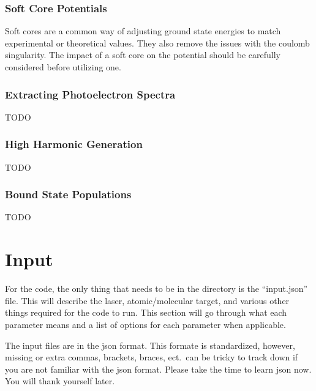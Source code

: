 \documentclass{article}
\begin{document}
\subsubsection{Soft Core Potentials} %
\label{ssub:soft_core_potentials}
Soft cores are a common way of adjusting ground state energies to match experimental or theoretical values. They also remove the issues with the coulomb singularity. The impact of a soft core on the potential should be carefully considered before utilizing one.

\subsubsection{Extracting Photoelectron Spectra} %
\label{ssub:extracting_photoelectron_spectra}
TODO

\subsubsection{High Harmonic Generation} %
\label{ssub:high_harmonic_generation}
TODO

\subsubsection{Bound State Populations} %
\label{ssub:bound_state_populations}
TODO


\section{Input} %
\label{sec:input}

For the code, the only thing that needs to be in the directory is the ``input.json'' file. This will describe the laser, atomic/molecular target, and various other things required for the code to run. This section will go through what each parameter means and a list of options for each parameter when applicable.

The input files are in the json format. This formate is standardized, however, missing or extra commas, brackets, braces, ect.\ can be tricky to track down if you are not familiar with the json format. Please take the time to learn json now. You will thank yourself later.
\end{document}
